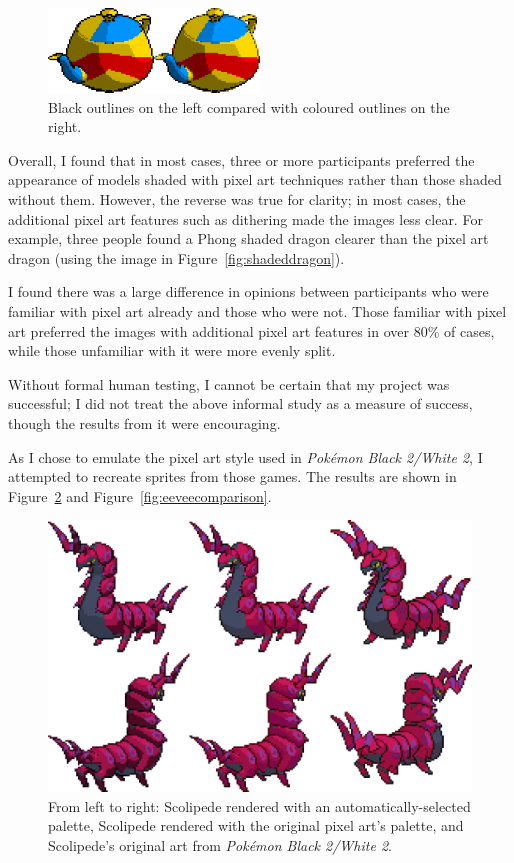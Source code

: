\documentclass[12pt,twoside,notitlepage]{report}
\begin{document}
\begin{figure}[h!]
\centering
\includegraphics[width=0.5\textwidth]{outlinecomparison}
\caption{Black outlines on the left compared with coloured outlines on the right.}
\label{fig:outlinecomparison}
\end{figure}

Overall, I found that in most cases, three or more participants preferred the appearance of models shaded with pixel art techniques rather than those shaded without them. However, the reverse was true for clarity; in most cases, the additional pixel art features such as dithering made the images less clear. For example, three people found a Phong shaded dragon clearer than the pixel art dragon (using the image in Figure~\ref{fig:shadeddragon}).

I found there was a large difference in opinions between participants who were familiar with pixel art already and those who were not. Those familiar with pixel art preferred the images with additional pixel art features in over 80\% of cases, while those unfamiliar with it were more evenly split.

Without formal human testing, I cannot be certain that my project was successful; I did not treat the above informal study as a measure of success, though the results from it were encouraging.

As I chose to emulate the pixel art style used in \textit{Pok\'{e}mon Black 2/White 2}, I attempted to recreate sprites from those games. The results are shown in Figure~\ref{fig:scolipedecomparison} and Figure~\ref{fig:eeveecomparison}.

\begin{figure}[h!]
\centering
\includegraphics[width=\textwidth]{scolipedecomparison}
\caption{From left to right: Scolipede rendered with an automatically-selected palette, Scolipede rendered with the original pixel art's palette, and Scolipede's original art from \textit{Pok\'{e}mon Black 2/White 2}.}
\label{fig:scolipedecomparison}
\end{figure}
\end{document}
